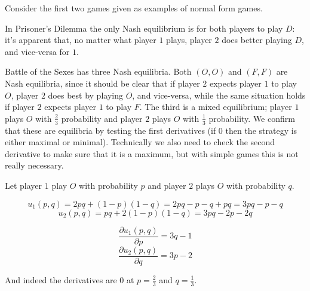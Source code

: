 \documentclass[12pt]{article}
\begin{document}
Consider the first two games given as examples of normal form games.

In Prisoner's Dilemma the only Nash equilibrium is for both players to play $D$: it's apparent that, no matter what player $1$ plays, player $2$ does better playing $D$, and vice-versa for $1$.

Battle of the Sexes has three Nash equilibria.  Both $(O,O)$ and $(F,F)$ are Nash equilibria, since it should be clear that if player $2$ expects player $1$ to play $O$, player $2$ does best by playing $O$, and vice-versa, while the same situation holds if player $2$ expects player $1$ to play $F$.  The third is a mixed equilibrium; player $1$ plays $O$ with $\frac{2}{3}$ probability and player $2$ plays $O$ with $\frac{1}{3}$ probability.  We confirm that these are equilibria by testing the first derivatives (if $0$ then the strategy is either maximal or minimal).  Technically we also need to check the second derivative to make sure that it is a maximum, but with simple games this is not really necessary.

Let player $1$ play $O$ with probability $p$ and player $2$ plays $O$ with probability $q$.

\begin{displaymath}
u_1(p,q)=2pq+(1-p)(1-q)=2pq-p-q+pq=3pq-p-q
\end{displaymath}
\begin{displaymath}
u_2(p,q)=pq+2(1-p)(1-q)=3pq-2p-2q
\end{displaymath}

\begin{displaymath}
\frac{\partial u_1(p,q)}{\partial p}=3q-1
\end{displaymath}
\begin{displaymath}
\frac{\partial u_2(p,q)}{\partial q}=3p-2
\end{displaymath}

And indeed the derivatives are $0$ at $p=\frac{2}{3}$ and $q=\frac{1}{3}$.
\end{document}
